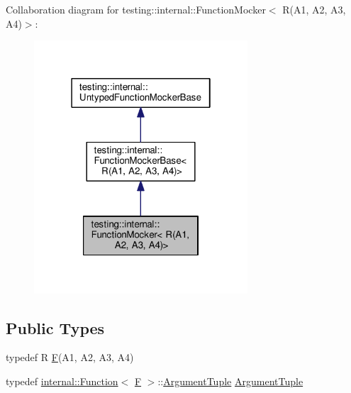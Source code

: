 Collaboration diagram for testing\+:\+:internal\+:\+:Function\+Mocker$<$ R(A1, A2, A3, A4)$>$\+:\nopagebreak
\begin{figure}[H]
\begin{center}
\leavevmode
\includegraphics[width=226pt]{classtesting_1_1internal_1_1FunctionMocker_3_01R_07A1_00_01A2_00_01A3_00_01A4_08_4__coll__graph}
\end{center}
\end{figure}
\subsection*{Public Types}
\begin{DoxyCompactItemize}
\item 
typedef R \hyperlink{classtesting_1_1internal_1_1FunctionMocker_3_01R_07A1_00_01A2_00_01A3_00_01A4_08_4_a9be04bb962edb1458c857ca8e9db9318}{F}(A1, A2, A3, A4)
\item 
typedef \hyperlink{structtesting_1_1internal_1_1Function}{internal\+::\+Function}$<$ \hyperlink{classtesting_1_1internal_1_1FunctionMocker_3_01R_07A1_00_01A2_00_01A3_00_01A4_08_4_a9be04bb962edb1458c857ca8e9db9318}{F} $>$\+::\hyperlink{classtesting_1_1internal_1_1FunctionMocker_3_01R_07A1_00_01A2_00_01A3_00_01A4_08_4_a97576d71dfe85cbb0fc51fcaad6d4cc1}{Argument\+Tuple} \hyperlink{classtesting_1_1internal_1_1FunctionMocker_3_01R_07A1_00_01A2_00_01A3_00_01A4_08_4_a97576d71dfe85cbb0fc51fcaad6d4cc1}{Argument\+Tuple}
\end{DoxyCompactItemize}
